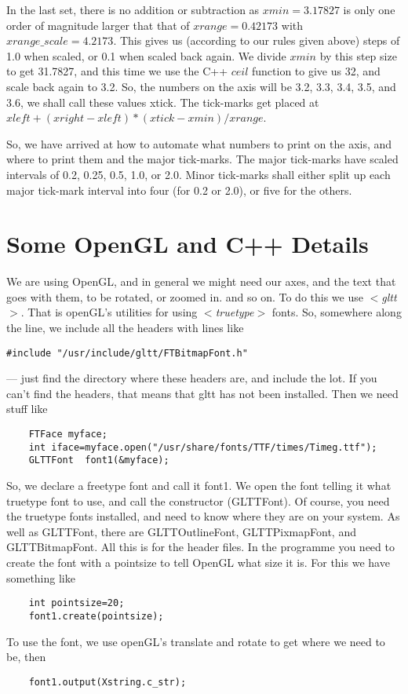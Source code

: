 \documentclass[12pt]{article}
\begin{document}
 In the last set, there is no addition or subtraction as $xmin=3.17827$ is only one 
order of magnitude larger that that of $xrange=0.42173$ with 
$xrange\_scale=4.2173$. This gives us (according to our rules given above)
steps of 1.0 when scaled, or 0.1 when scaled back again. We divide $xmin$
by this step size to get 31.7827, and this time we use the C++ $ceil$ function
to give us 32, and scale back again to 3.2. So, the numbers on the axis
will be 3.2, 3.3, 3.4, 3.5, and 3.6, we shall call these values xtick. 
 The tick-marks get placed at $xleft+(xright-xleft)*(xtick-xmin)/xrange$.

So, we have arrived at how to automate what numbers to print on the axis, and
 where to print them and the major tick-marks. The major tick-marks
have scaled intervals of  0.2, 0.25, 0.5, 1.0, or 2.0. Minor tick-marks
 shall either split up each major tick-mark interval into four (for 0.2 or 2.0), or five for the others.

\section{Some OpenGL and  C++ Details}

We are using OpenGL, and in general we might need our axes, and the text
that goes with them, to be rotated, or zoomed in. and so on.
To do this we use $<${\it gltt}$>$. That is openGL's utilities for using 
$<${\it truetype}$>$ fonts. So, somewhere along the line, we include all 
the headers with lines like
\begin{verbatim}
#include "/usr/include/gltt/FTBitmapFont.h"
\end{verbatim}
 --- just find the directory where these headers are, and include the lot.
If you can't find the headers, that means that gltt has not been installed.
Then we need stuff like
\begin{verbatim}
    FTFace myface;
    int iface=myface.open("/usr/share/fonts/TTF/times/Timeg.ttf");
    GLTTFont  font1(&myface);
\end{verbatim}
So, we declare a freetype font and call it font1. We open the
font telling it what truetype font to use, and call the constructor (GLTTFont). Of course, you need the truetype
fonts installed, and need to know where they are on your system.
As well as GLTTFont, there are GLTTOutlineFont, GLTTPixmapFont, and
GLTTBitmapFont. All this is for the header files. In the programme
you need to create the font with a pointsize to tell OpenGL what size it
is. For this we have  something like
\begin{verbatim}
    int pointsize=20;
    font1.create(pointsize);
\end{verbatim}
To use the font, we use openGL's translate and rotate to get where
we need to be, then
\begin{verbatim}
    font1.output(Xstring.c_str);
\end{verbatim}
\end{document}

